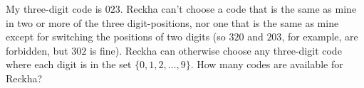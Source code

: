 My three-digit code is $023$. Reckha can't choose a code that is the same as mine in two or more of the three digit-positions, nor one that is the same as mine except for switching the positions of two digits (so $320$ and $203$, for example, are forbidden, but $302$ is fine). Reckha can otherwise choose any three-digit code where each digit is in the set $\{0,1,2,\dots,9\}$. How many codes are available for Reckha?
